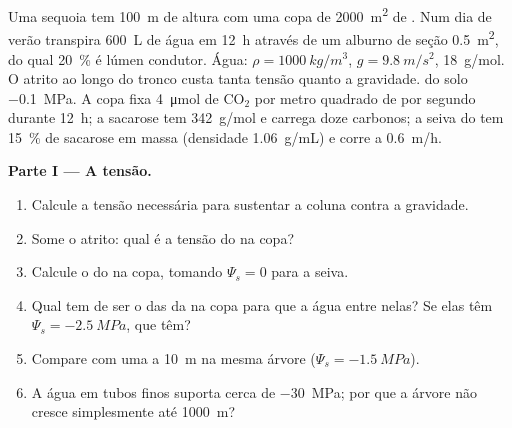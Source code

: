 \begin{problem}
\label{pb:b1:plant-transport:1}
Uma sequoia tem \qty{100}{m} de altura com uma copa de \qty{2000}{m^2}
de . Num dia de verão transpira \qty{600}{L} de água em
\qty{12}{h} através de um alburno de seção \qty{0.5}{m^2}, do qual
\qty{20}{\%} é lúmen condutor. Água: $\rho = \qty{1000}{kg/m^3}$, $g =
\qty{9.8}{m/s^2}$, \qty{18}{g/mol}. O atrito ao longo do tronco custa
tanta tensão quanto a gravidade.  do solo
\qty{-0.1}{MPa}. A copa fixa \qty{4}{\micro mol} de $\mathrm{CO_2}$ por
metro quadrado de  por segundo durante \qty{12}{h}; a sacarose
tem \qty{342}{g/mol} e carrega doze carbonos; a seiva do  tem
\qty{15}{\%} de sacarose em massa (densidade \qty{1.06}{g/mL}) e corre
a \qty{0.6}{m/h}.

\medskip
\noindent\textbf{Parte I --- A tensão.}
\begin{enumerate}
  \item Calcule a tensão necessária para sustentar a coluna contra a
        gravidade.
  \item Some o atrito: qual é a tensão do  na copa?
  \item Calcule o  do  na copa, tomando
        $\Psi_s = 0$ para a seiva.
  \item Qual tem de ser o  das  da  na
        copa para que a água entre nelas? Se elas têm
        $\Psi_s = \qty{-2.5}{MPa}$, que  têm?
  \item Compare com uma  a \qty{10}{m} na mesma árvore ($\Psi_s =
        \qty{-1.5}{MPa}$).
  \item A água em tubos finos suporta cerca de \qty{-30}{MPa}; por que
        a árvore não cresce simplesmente até \qty{1000}{m}?
\end{enumerate}


\end{problem}
